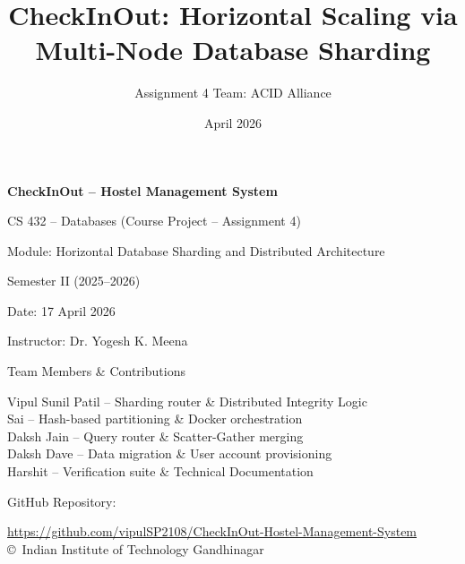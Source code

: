 \documentclass[sigconf]{acmart}
\title{CheckInOut: Horizontal Scaling via Multi-Node Database Sharding}
\author{Assignment 4 Team: ACID Alliance}
\affiliation{%
  \institution{Indian Institute of Technology Gandhinagar}
  \city{Gandhinagar}
  \country{India}
}
\date{April 2026}
\begin{document}
\begin{titlepage}
    \centering
    \vspace*{2cm}
    {\Huge\bfseries CheckInOut -- Hostel Management System\par}
    \vspace{1cm}
    {\Large CS 432 -- Databases (Course Project -- Assignment 4)\par}
    \vspace{0.5cm}
    {\large Module: Horizontal Database Sharding and Distributed Architecture\par}
    \vspace{1.5cm}
    {\large Semester II (2025--2026)\par}
    \vspace{0.5cm}
    {\large Date: 17 April 2026\par}
    \vfill
    {\large Instructor: Dr. Yogesh K. Meena\par}
    \vspace{1cm}
    {\large Team Members \& Contributions\par}
    \vspace{0.5cm}
    Vipul Sunil Patil -- Sharding router \& Distributed Integrity Logic\\
    Sai -- Hash-based partitioning \& Docker orchestration\\
    Daksh Jain -- Query router \& Scatter-Gather merging\\
    Daksh Dave -- Data migration \& User account provisioning\\
    Harshit -- Verification suite \& Technical Documentation\\
    \vspace{1cm}
    {\large GitHub Repository:\par}
    \vspace{0.1cm}
    {\small \url{https://github.com/vipulSP2108/CheckInOut-Hostel-Management-System}}
    \vfill
    {\small \copyright\ Indian Institute of Technology Gandhinagar}
\end{titlepage}

\setcounter{page}{1}
\end{document}
